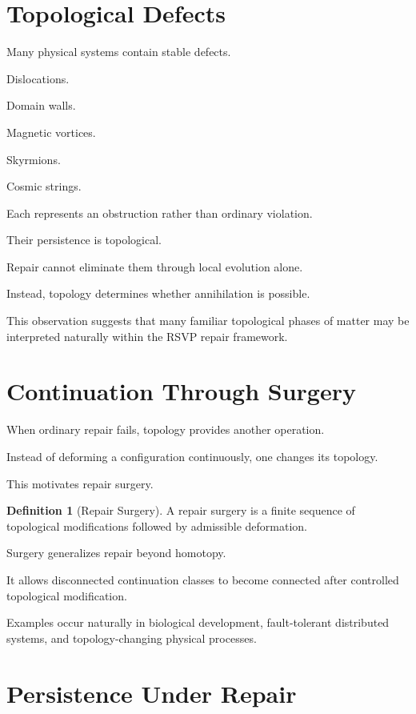 \documentclass[11pt,oneside]{book}
\numberwithin{equation}{chapter}
\theoremstyle{definition}
\newtheorem{definition}{Definition}[chapter]
\theoremstyle{plain}
\begin{document}
\section{Topological Defects}

Many physical systems contain stable defects.

Dislocations.

Domain walls.

Magnetic vortices.

Skyrmions.

Cosmic strings.

Each represents an obstruction rather than ordinary violation.

Their persistence is topological.

Repair cannot eliminate them through local evolution alone.

Instead, topology determines whether annihilation is possible.

This observation suggests that many familiar topological phases of matter may
be interpreted naturally within the RSVP repair framework.

\section{Continuation Through Surgery}

When ordinary repair fails, topology provides another operation.

Instead of deforming a configuration continuously, one changes its topology.

This motivates repair surgery.

\begin{definition}[Repair Surgery]

A repair surgery is a finite sequence of topological modifications followed
by admissible deformation.

\end{definition}

Surgery generalizes repair beyond homotopy.

It allows disconnected continuation classes to become connected after
controlled topological modification.

Examples occur naturally in biological development, fault-tolerant
distributed systems, and topology-changing physical processes.

\section{Persistence Under Repair}
\end{document}
